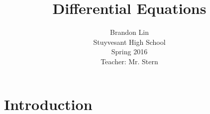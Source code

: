 \documentclass[12pt]{article}
\begin{document}
\title{Differential Equations}
\author{Brandon Lin\\Stuyvesant High School\\Spring 2016\\Teacher: Mr. Stern}
\maketitle
\newpage
\section*{Introduction}
\end{document}
